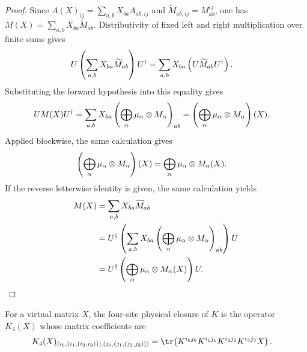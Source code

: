 \begin{proof}\leanok
    Since $A(X)_{ij}=\sum_{a,b}X_{ba}A_{ab,ij}$ and
    $\widetilde M_{ab,ij}=M^{ij}_{ab}$, one has
    $M(X)=\sum_{a,b}X_{ba}\widetilde M_{ab}$.
    Distributivity of fixed left and right multiplication over finite sums
    gives
    \begin{align}
        U\left(\sum_{a,b}X_{ba}\widetilde M_{ab}\right)U^\dagger
         & =\sum_{a,b}X_{ba}
        \left(U\widetilde M_{ab}U^\dagger\right).
        \notag
    \end{align}
    Substituting the forward hypothesis into this equality gives
    \begin{align}
        U M(X)U^\dagger
         & =\sum_{a,b}X_{ba}
        \left(\bigoplus_\alpha\mu_\alpha\otimes M_\alpha\right)_{ab}
        =\left(\bigoplus_\alpha\mu_\alpha\otimes M_\alpha\right)(X).
        \notag
    \end{align}
    Applied blockwise, the same calculation gives
    \begin{align}
        \left(\bigoplus_\alpha \mu_\alpha\otimes M_\alpha\right)(X)
         & =\bigoplus_\alpha \mu_\alpha\otimes M_\alpha(X).
        \notag
    \end{align}
    If the reverse letterwise identity is given, the same calculation yields
    \begin{align}
        M(X)
         & =\sum_{a,b}X_{ba}\widetilde M_{ab}
        \notag                                                                    \\
         & =U^\dagger\left(\sum_{a,b}X_{ba}
        \left(\bigoplus_\alpha\mu_\alpha\otimes M_\alpha\right)_{ab}\right)U
        \notag                                                                    \\
         & =U^\dagger\left(\bigoplus_\alpha\mu_\alpha\otimes M_\alpha(X)\right)U.
        \notag
    \end{align}
\end{proof}

\begin{definition}
    \label{def:mpdo_four_site_physical_closure}
    \leanok
    For a virtual matrix $X$, the four-site physical closure of $K$ is the
    operator $K_4(X)$ whose matrix coefficients are
    \begin{align}
        K_4(X)_{(i_0,(i_1,(i_2,i_3))),(j_0,(j_1,(j_2,j_3)))}
         & =\tr\!\left(K^{i_0j_0}K^{i_1j_1}K^{i_2j_2}K^{i_3j_3}X\right).
        \notag
    \end{align}
\end{definition}

